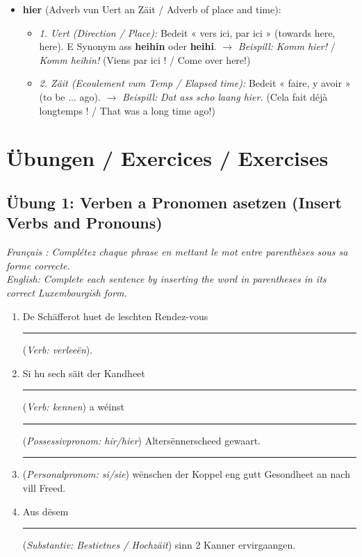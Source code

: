 \begin{itemize}
\begin{itemize}
        \vspace{0.4em}

        \item \textbf{hier} (Adverb vun Uert an Zäit / Adverb of place and time):
        \begin{itemize}
            \item \textit{1. Uert (Direction / Place):} Bedeit « vers ici, par ici » (towards here, here). E Synonym ass \textbf{heihin} oder \textbf{heihi}.
            $\rightarrow$ \textit{Beispill:} \textit{Komm hier!} / \textit{Komm heihin!} (Viens par ici ! / Come over here!)
            \item \textit{2. Zäit (Ecoulement vum Temp / Elapsed time):} Bedeit « faire, y avoir » (to be ... ago).
            $\rightarrow$ \textit{Beispill:} \textit{Dat ass scho laang hier.} (Cela fait déjà longtemps ! / That was a long time ago!)
        \end{itemize}
    \end{itemize}
\end{itemize}

\vspace{1.5em}

\section[Übungen / Exercises]{Übungen / Exercices / Exercises}

\subsection*{Übung 1: Verben a Pronomen asetzen (Insert Verbs and Pronouns)}
\textit{Français : Complétez chaque phrase en mettant le mot entre parenthèses sous sa forme correcte.}\\
\textit{English: Complete each sentence by inserting the word in parentheses in its correct Luxembourgish form.}

\begin{enumerate}
    \item De Schäfferot huet de leschten Rendez-vous \rule{3cm}{0.4pt} (\textit{Verb: verleeën}).
    \item Si hu sech säit der Kandheet \rule{3cm}{0.4pt} (\textit{Verb: kennen}) a wéinst \rule{3cm}{0.4pt} (\textit{Possessivpronom: hir/hier}) Altersënnerscheed gewaart.
    \item \rule{3cm}{0.4pt} (\textit{Personalpronom: si/sie}) wënschen der Koppel eng gutt Gesondheet an nach vill Freed.
    \item Aus dësem \rule{3cm}{0.4pt} (\textit{Substantiv: Bestietnes / Hochzäit}) sinn 2 Kanner ervirgaangen.
\end{enumerate}

